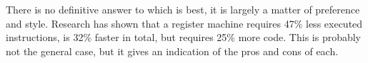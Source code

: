 There is no definitive answer to which is best, it is largely a matter of
preference and style. Research has shown that a register machine requires 47\%
less executed instructions, is 32\% faster in total, but requires 25\% more
code\cite{shi05}. This is probably not the general case, but it gives an
indication of the pros and cons of each.



